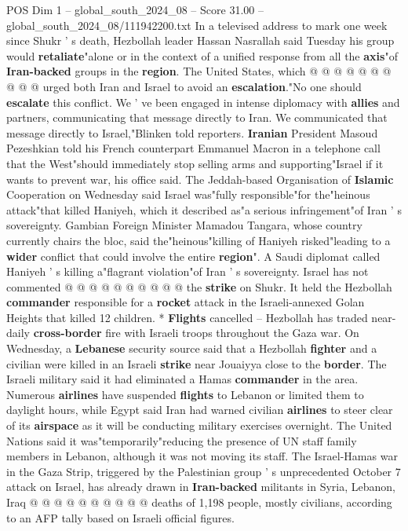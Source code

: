 \begin{textsample}{POS Dim 1 – global\_south\_2024\_08 – Score 31.00 – global\_south\_2024\_08/111942200.txt}
In a televised address to mark one week since Shukr ' s death, Hezbollah leader Hassan Nasrallah said Tuesday his group would \textbf{retaliate}"alone or in the context of a unified response from all the \textbf{axis}"of \textbf{Iran-backed} groups in the \textbf{region}.
The United States, which @ @ @ @ @ @ @ @ @ @ urged both Iran and Israel to avoid an \textbf{escalation}."No one should \textbf{escalate} this conflict.
We ' ve been engaged in intense diplomacy with \textbf{allies} and partners, communicating that message directly to Iran.
We communicated that message directly to Israel,"Blinken told reporters. \textbf{Iranian} President Masoud Pezeshkian told his French counterpart Emmanuel Macron in a telephone call that the West"should immediately stop selling arms and supporting"Israel if it wants to prevent war, his office said.
The Jeddah-based Organisation of \textbf{Islamic} Cooperation on Wednesday said Israel was"fully responsible"for the"heinous attack"that killed Haniyeh, which it described as"a serious infringement"of Iran ' s sovereignty.
Gambian Foreign Minister Mamadou Tangara, whose country currently chairs the bloc, said the"heinous"killing of Haniyeh risked"leading to a \textbf{wider} conflict that could involve the entire \textbf{region}".
A Saudi diplomat called Haniyeh ' s killing a"flagrant violation"of Iran ' s sovereignty.
Israel has not commented @ @ @ @ @ @ @ @ @ @ the \textbf{strike} on Shukr.
It held the Hezbollah \textbf{commander} responsible for a \textbf{rocket} attack in the Israeli-annexed Golan Heights that killed 12 children. * \textbf{Flights} cancelled -- Hezbollah has traded near-daily \textbf{cross-border} fire with Israeli troops throughout the Gaza war.
On Wednesday, a \textbf{Lebanese} security source said that a Hezbollah \textbf{fighter} and a civilian were killed in an Israeli \textbf{strike} near Jouaiyya close to the \textbf{border}.
The Israeli military said it had eliminated a Hamas \textbf{commander} in the area.
Numerous \textbf{airlines} have suspended \textbf{flights} to Lebanon or limited them to daylight hours, while Egypt said Iran had warned civilian \textbf{airlines} to steer clear of its \textbf{airspace} as it will be conducting military exercises overnight.
The United Nations said it was"temporarily"reducing the presence of UN staff family members in Lebanon, although it was not moving its staff.
The Israel-Hamas war in the Gaza Strip, triggered by the Palestinian group ' s unprecedented October 7 attack on Israel, has already drawn in \textbf{Iran-backed} militants in Syria, Lebanon, Iraq @ @ @ @ @ @ @ @ @ @ deaths of 1,198 people, mostly civilians, according to an AFP tally based on Israeli official figures.

\end{textsample}
